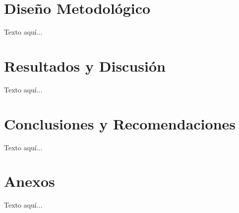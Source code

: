 \documentclass[12pt,letterpaper]{article}
\begin{document}
\section{Diseño Metodológico}
Texto aquí...

\section{Resultados y Discusión}
Texto aquí...

\section{Conclusiones y Recomendaciones}
Texto aquí...

\printbibliography[title={Bibliografía}]

\section*{Anexos}
Texto aquí...
\end{document}

